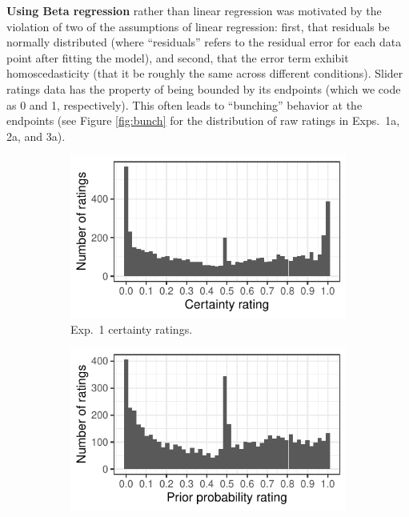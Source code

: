 \documentclass[11pt,fleqn]{article}
\newcommand{\6}{\mbox{$[\hspace*{-.6mm}[$}}
\newcommand{\9}{\mbox{$]\hspace*{-.6mm}]$}}
\begin{document}
\textbf{Using Beta regression} rather than linear regression was motivated by the violation of two of the  assumptions of linear regression: first, that residuals be normally distributed (where ``residuals'' refers to the residual error for each data point after fitting the model), and second, that the error term exhibit homoscedasticity (that it be roughly the same across different conditions). Slider ratings data has the property of being bounded by its endpoints (which we code as 0 and 1, respectively). This often leads to ``bunching'' behavior at the endpoints (see Figure \ref{fig:bunch} for the distribution of raw ratings in Exps.~1a, 2a, and 3a). 


\begin{figure}[h!]
\begin{subfigure}{.33\textwidth}
\includegraphics[width=\textwidth]{../../results/exp4/graphs/bunching-projection}
\caption{Exp.~1 certainty ratings.}
\label{fig:exp1araw}
\end{subfigure}
\begin{subfigure}{.33\textwidth}
\includegraphics[width=\textwidth]{../../results/exp4/graphs/bunching-prior}

\end{subfigure}
\end{figure}
\end{document}
